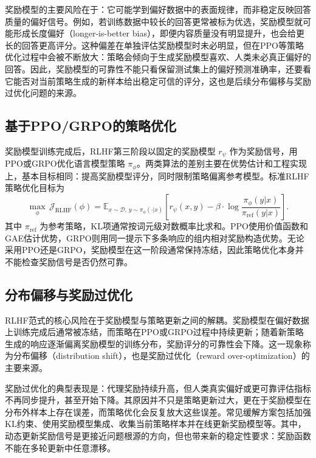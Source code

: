 奖励模型的主要风险在于：它可能学到偏好数据中的表面规律，而非稳定反映回答质量的偏好信号\cite{gao2023scaling}。例如，若训练数据中较长的回答更常被标为优选，奖励模型就可能形成长度偏好（longer-is-better bias），即便内容质量没有明显提升，也会给更长的回答更高评分\cite{zheng2023secrets}。这种偏差在单独评估奖励模型时未必明显，但在PPO等策略优化过程中会被不断放大：策略会倾向于生成奖励模型喜欢、人类未必真正偏好的回答。因此，奖励模型的可靠性不能只看保留测试集上的偏好预测准确率，还要看它能否对当前策略生成的新样本给出稳定可信的评分，这也是后续分布偏移与奖励过优化问题的来源\cite{gao2023scaling,li2023reward}。


\subsection{基于PPO/GRPO的策略优化}

奖励模型训练完成后，RLHF第三阶段以固定的奖励模型 $r_\psi$ 作为奖励信号，用PPO或GRPO优化语言模型策略 $\pi_\phi$。两类算法的差别主要在优势估计和工程实现上，基本目标相同：提高奖励模型评分，同时限制策略偏离参考模型。标准RLHF策略优化目标为\cite{ouyang2022training}
\begin{equation}
    \max_\phi\, \mathcal{J}_{\text{RLHF}}(\phi) = \mathbb{E}_{x \sim \mathcal{D},\, y \sim \pi_\phi(\cdot|x)}\left[r_\psi(x, y) - \beta \cdot \log\frac{\pi_\phi(y|x)}{\pi_{\text{ref}}(y|x)}\right].
    \label{eq:rlhf_obj}
\end{equation}
其中 $\pi_{\text{ref}}$ 为参考策略，KL项通常按词元级对数概率比求和。PPO使用价值函数和GAE估计优势，GRPO则用同一提示下多条响应的组内相对奖励构造优势。无论采用PPO还是GRPO，奖励模型在这一阶段通常保持冻结，因此策略优化本身并不能检查奖励信号是否仍然可靠。


\subsection{分布偏移与奖励过优化}

RLHF范式的核心风险在于奖励模型与策略更新之间的解耦。奖励模型在偏好数据上训练完成后通常被冻结，而策略在PPO或GRPO过程中持续更新；随着新策略生成的响应逐渐偏离奖励模型的训练分布，奖励评分的可靠性会下降。这一现象称为分布偏移（distribution shift），也是奖励过优化（reward over-optimization）的主要来源\cite{gao2023scaling}。

奖励过优化的典型表现是：代理奖励持续升高，但人类真实偏好或更可靠评估指标不再同步提升，甚至开始下降。其原因并不只是策略更新过大，更在于奖励模型在分布外样本上存在误差，而策略优化会反复放大这些误差。常见缓解方案包括加强KL约束、使用奖励模型集成、收集当前策略样本并在线更新奖励模型等\cite{moskovitz2023fool,online_rlhf_2025}。其中，动态更新奖励信号是更接近问题根源的方向，但也带来新的稳定性要求：奖励函数不能在多轮更新中任意漂移。

